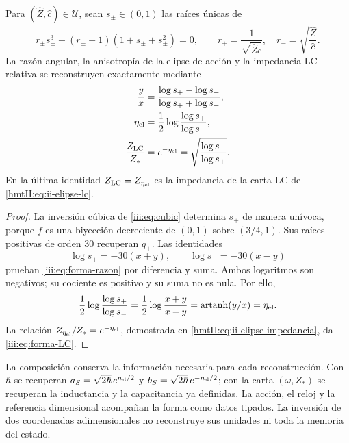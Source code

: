 \begin{proposition}
\label{iii:prop:forma-LC}
Para $(\widehat Z,\widehat c)\in\mathcal U$, sean $s_\pm\in(0,1)$ las
raíces únicas de
\begin{equation}
 r_\pm s_\pm^3+(r_\pm-1)(1+s_\pm+s_\pm^2)=0,
 \qquad
 r_+=\frac1{\sqrt{\widehat Z\widehat c}},\quad
 r_-=\sqrt{\frac{\widehat Z}{\widehat c}}.
 \label{iii:eq:forma-inversion}
\end{equation}
La razón angular, la anisotropía de la elipse de acción y la impedancia
LC relativa se reconstruyen exactamente mediante
\begin{align}
 \frac{y}{x}
 &=\frac{\log s_+-\log s_-}{\log s_++\log s_-},
 \label{iii:eq:forma-razon}\\
 \eta_{\rm el}
 &=\frac12\log\frac{\log s_+}{\log s_-},
 \label{iii:eq:forma-eta}\\
 \frac{Z_{\rm LC}}{Z_*}
 &=e^{-\eta_{\rm el}}
  =\sqrt{\frac{\log s_-}{\log s_+}}.
 \label{iii:eq:forma-LC}
\end{align}
En la última identidad $Z_{\rm LC}=Z_{\eta_{\rm el}}$ es la impedancia
de la carta LC de \eqref{hmtII:eq:ii-elipse-lc}.
\end{proposition}
\begin{proof}
La inversión cúbica de \eqref{iii:eq:cubic} determina $s_\pm$ de manera
unívoca, porque $f$ es una biyección decreciente de $(0,1)$ sobre
$(3/4,1)$. Sus raíces positivas de orden $30$ recuperan $q_\pm$.
Las identidades
\[
 \log s_+=-30(x+y),\qquad \log s_-=-30(x-y)
\]
prueban \eqref{iii:eq:forma-razon} por diferencia y suma. Ambos logaritmos
son negativos; su cociente es positivo y su suma no es nula. Por ello,
\[
 \frac12\log\frac{\log s_+}{\log s_-}
   =\frac12\log\frac{x+y}{x-y}
   =\operatorname{artanh}(y/x)=\eta_{\rm el}.
\]
La relación $Z_{\eta_{\rm el}}/Z_*=e^{-\eta_{\rm el}}$, demostrada en
\eqref{hmtII:eq:ii-elipse-impedancia}, da \eqref{iii:eq:forma-LC}.
\end{proof}

La composición conserva la información necesaria para cada reconstrucción.
Con $\hbar$ se recuperan
$a_S=\sqrt{2\hbar}\,e^{\eta_{\rm el}/2}$ y
$b_S=\sqrt{2\hbar}\,e^{-\eta_{\rm el}/2}$; con la carta
$(\omega,Z_*)$ se recuperan la inductancia y la capacitancia ya definidas.
La acción, el reloj y la referencia dimensional acompañan la forma como
datos tipados. La inversión de dos coordenadas adimensionales no
reconstruye sus unidades ni toda la memoria del estado.

